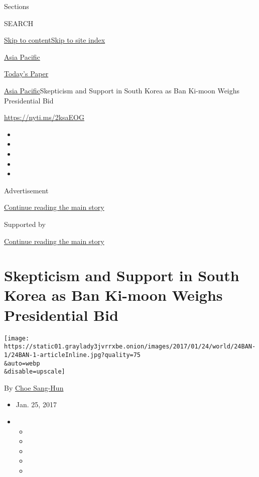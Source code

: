 Sections

SEARCH

\protect\hyperlink{site-content}{Skip to
content}\protect\hyperlink{site-index}{Skip to site index}

\href{https://www.nytimes3xbfgragh.onion/section/world/asia}{Asia
Pacific}

\href{https://myaccount.nytimes3xbfgragh.onion/auth/login?response_type=cookie\&client_id=vi}{}

\href{https://www.nytimes3xbfgragh.onion/section/todayspaper}{Today's
Paper}

\href{/section/world/asia}{Asia Pacific}\textbar{}Skepticism and Support
in South Korea as Ban Ki-moon Weighs Presidential Bid

\url{https://nyti.ms/2ksaEOG}

\begin{itemize}
\item
\item
\item
\item
\item
\end{itemize}

Advertisement

\protect\hyperlink{after-top}{Continue reading the main story}

Supported by

\protect\hyperlink{after-sponsor}{Continue reading the main story}

\hypertarget{skepticism-and-support-in-south-korea-as-ban-ki-moon-weighs-presidential-bid}{%
\section{Skepticism and Support in South Korea as Ban Ki-moon Weighs
Presidential
Bid}\label{skepticism-and-support-in-south-korea-as-ban-ki-moon-weighs-presidential-bid}}

\texttt{[image: https://static01.graylady3jvrrxbe.onion/images/2017/01/24/world/24BAN-1/24BAN-1-articleInline.jpg?quality=75\\\&auto=webp\\\&disable=upscale]}

By \href{http://www.nytimes3xbfgragh.onion/by/choe-sang-hun}{Choe
Sang-Hun}

\begin{itemize}
\item
  Jan. 25, 2017
\item
  \begin{itemize}
  \item
  \item
  \item
  \item
  \item
  \end{itemize}
\end{itemize}

